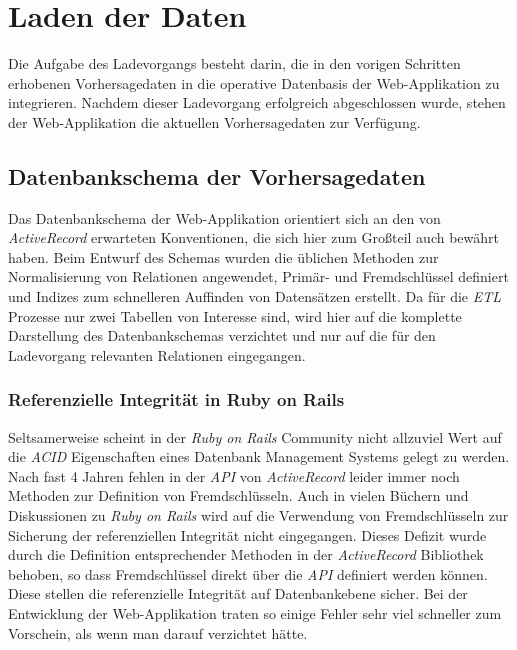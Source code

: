 \section{Laden der Daten}
Die Aufgabe des Ladevorgangs besteht darin, die in den vorigen
Schritten erhobenen Vorhersagedaten in die operative Datenbasis der
Web-Applikation zu integrieren. Nachdem dieser Ladevorgang erfolgreich
abgeschlossen wurde, stehen der Web-Applikation die aktuellen
Vorhersagedaten zur Verfügung. 

\subsection{Datenbankschema der Vorhersagedaten}
Das Datenbankschema der Web-Applikation orientiert sich an den von
\textit{ActiveRecord} erwarteten Konventionen, die sich hier zum
Großteil auch bewährt haben. Beim Entwurf des Schemas wurden die
üblichen Methoden zur Normalisierung von Relationen angewendet,
Primär- und Fremdschlüssel definiert und Indizes zum schnelleren
Auffinden von Datensätzen erstellt. Da für die \textit{ETL} Prozesse
nur zwei Tabellen von Interesse sind, wird hier auf die komplette
Darstellung des Datenbankschemas verzichtet und nur auf die für den
Ladevorgang relevanten Relationen eingegangen.

\subsubsection{Referenzielle Integrität in Ruby on Rails}
Seltsamerweise scheint in der \textit{Ruby on Rails} Community nicht
allzuviel Wert auf die \textit{ACID}  Eigenschaften eines Datenbank
Management Systems gelegt zu werden. Nach fast 4 Jahren fehlen in der
\textit{API} von \textit{ActiveRecord} leider immer noch Methoden zur
Definition von Fremdschlüsseln. Auch in vielen Büchern und
Diskussionen zu \textit{Ruby on Rails} wird auf die Verwendung von
Fremdschlüsseln zur Sicherung der referenziellen Integrität nicht
eingegangen. Dieses Defizit wurde durch die Definition entsprechender
Methoden in der \textit{ActiveRecord} Bibliothek behoben, so dass
Fremdschlüssel direkt über die \textit{API} definiert werden
können. Diese stellen die referenzielle Integrität auf Datenbankebene
sicher. Bei der Entwicklung der Web-Applikation traten so einige
Fehler sehr viel schneller zum Vorschein, als wenn man darauf
verzichtet hätte.

